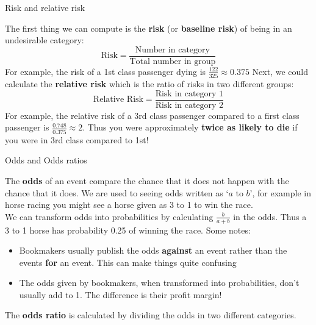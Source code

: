 \documentclass[12pt,xcolor=dvipsnames,handout,mathserif,aspectratio=169]{beamer}
\newcommand{\bbl}[1]{{\color{NavyBlue} \textbf{#1}}}
\newcommand{\bre}[1]{{\color{red} \textbf{#1}}}
\newcommand{\bgr}[1]{{\color{PineGreen} \textbf{#1}}}
\begin{document}
\begin{frame}{Risk and relative risk}

The first thing we can compute is the \bgr{risk} (or \bgr{baseline risk}) of being in an undesirable category:
$$\mbox{Risk} = \frac{ \mbox{Number in category} }{ \mbox{Total number in group} }$$
For example, the risk of a 1st class passenger dying is $\frac{122}{325} \approx 0.375$
\pause
\vspace{0.2cm}
Next, we could calculate the \bgr{relative risk} which is the ratio of risks in two different groups:
$$\mbox{Relative Risk} = \frac{ \mbox{Risk in category 1} }{ \mbox{Risk in category 2} }$$
For example, the relative risk of a 3rd class passenger compared to a first class passenger is $\frac{0.748}{0.375} \approx 2$. Thus you were approximately \bre{twice as likely to die} if you were in 3rd class compared to 1st!

\end{frame}

\begin{frame}{Odds and Odds ratios}

The \bbl{odds} of an event compare the chance that it does not happen with the chance that it does. We are used to seeing odds written as `$a$ to $b$', for example in horse racing you might see a horse given as 3 to 1 to win the race. \\
\vspace{0.2cm}
\pause
We can transform odds into probabilities by calculating $\frac{b}{a+b}$ in the odds. Thus a 3 to 1 horse has probability 0.25 of winning the race. 
Some notes:
\begin{itemize}
\item Bookmakers usually publish the odds \bbl{against} an event rather than the events \bgr{for} an event. This can make things quite confusing
\pause
\item The odds given by bookmakers, when transformed into probabilities, don't usually add to 1. The difference is their profit margin!
\end{itemize}
\vspace{0.2cm}
The \bgr{odds ratio} is calculated by dividing the odds in two different categories.

\end{frame}
\end{document}
